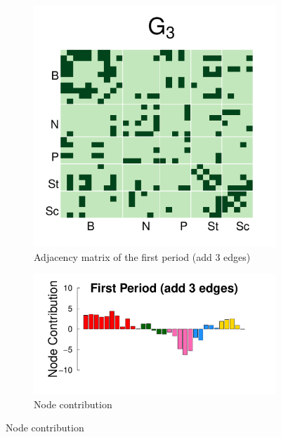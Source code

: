 \documentclass[12pt]{article}
\begin{document}
\begin{figure}[H]
	\centering
	\begin{subfigure}[b]{0.3\textwidth}
		\includegraphics[width=\textwidth]{../Figure/sim_Adj3.pdf}
		\caption{Adjacency matrix of the first period (add 3 edges)}
		\label{fig:step3}
	\end{subfigure}
	\begin{subfigure}[b]{0.6\textwidth}
		\includegraphics[width=\textwidth]{../Figure/step3.pdf}
		\caption{Node contribution}
		\label{fig:adj.step3}
	\end{subfigure}
\end{figure}
\end{document}
